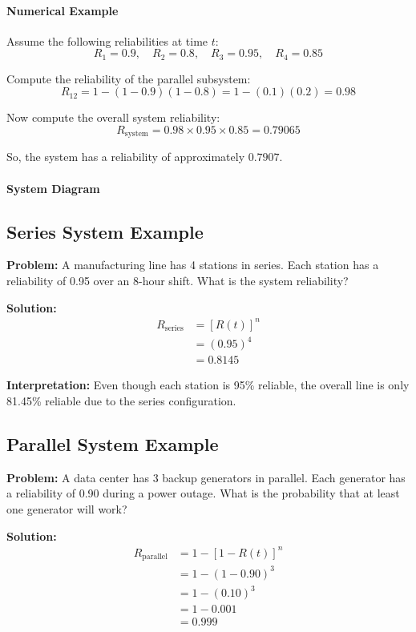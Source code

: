 \documentclass[twoside]{book}
\begin{document}
\paragraph{Numerical Example}

Assume the following reliabilities at time $t$:
\[
R_1 = 0.9, \quad R_2 = 0.8, \quad R_3 = 0.95, \quad R_4 = 0.85
\]

Compute the reliability of the parallel subsystem:
\[
R_{12} = 1 - (1 - 0.9)(1 - 0.8) = 1 - (0.1)(0.2) = 0.98
\]

Now compute the overall system reliability:
\[
R_{\text{system}} = 0.98 \times 0.95 \times 0.85 = 0.79065
\]

So, the system has a reliability of approximately $\boxed{0.7907}$.

\paragraph{System Diagram}


\subsection{Series System Example}

\textbf{Problem:} A manufacturing line has 4 stations in series. Each station has a reliability of 0.95 over an 8-hour shift. What is the system reliability?

\textbf{Solution:}
\begin{align}
R_{\text{series}} &= [R(t)]^n \\
&= (0.95)^4 \\
&= 0.8145
\end{align}

\textbf{Interpretation:} Even though each station is 95\% reliable, the overall line is only 81.45\% reliable due to the series configuration.

\subsection{Parallel System Example}

\textbf{Problem:} A data center has 3 backup generators in parallel. Each generator has a reliability of 0.90 during a power outage. What is the probability that at least one generator will work?

\textbf{Solution:}
\begin{align}
R_{\text{parallel}} &= 1 - [1 - R(t)]^n \\
&= 1 - (1 - 0.90)^3 \\
&= 1 - (0.10)^3 \\
&= 1 - 0.001 \\
&= 0.999
\end{align}
\end{document}
